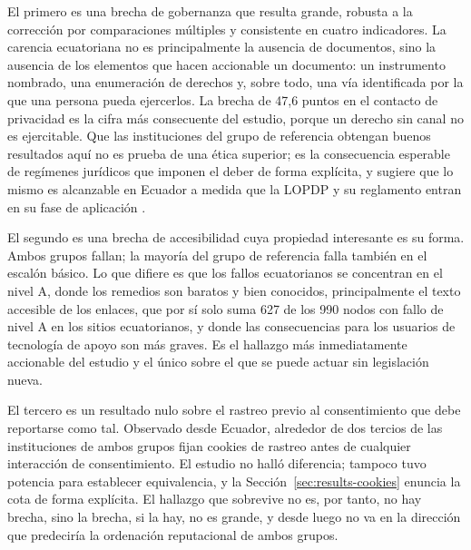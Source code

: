 \documentclass[pdflatex,sn-basic,Numbered,iicol]{sn-jnl}
\theoremstyle{thmstyleone}
\theoremstyle{thmstyletwo}
\theoremstyle{thmstylethree}
\begin{document}
El primero es una brecha de gobernanza que resulta grande, robusta a la correcci\'on por comparaciones m\'ultiples y consistente en cuatro indicadores. La carencia ecuatoriana no es principalmente la ausencia de documentos, sino la ausencia de los elementos que hacen accionable un documento: un instrumento nombrado, una enumeraci\'on de derechos y, sobre todo, una v\'ia identificada por la que una persona pueda ejercerlos. La brecha de 47,6 puntos en el contacto de privacidad es la cifra m\'as consecuente del estudio, porque un derecho sin canal no es ejercitable. Que las instituciones del grupo de referencia obtengan buenos resultados aqu\'i no es prueba de una \'etica superior; es la consecuencia esperable de reg\'imenes jur\'idicos que imponen el deber de forma expl\'icita, y sugiere que lo mismo es alcanzable en Ecuador a medida que la LOPDP y su reglamento entran en su fase de aplicaci\'on \citep{lopdp2021,reglamentolopdp2023}.

El segundo es una brecha de accesibilidad cuya propiedad interesante es su forma. Ambos grupos fallan; la mayor\'ia del grupo de referencia falla tambi\'en en el escal\'on b\'asico. Lo que difiere es que los fallos ecuatorianos se concentran en el nivel A, donde los remedios son baratos y bien conocidos, principalmente el texto accesible de los enlaces, que por s\'i solo suma 627 de los 990 nodos con fallo de nivel A en los sitios ecuatorianos, y donde las consecuencias para los usuarios de tecnolog\'ia de apoyo son m\'as graves. Es el hallazgo m\'as inmediatamente accionable del estudio y el \'unico sobre el que se puede actuar sin legislaci\'on nueva.

El tercero es un resultado nulo sobre el rastreo previo al consentimiento que debe reportarse como tal. Observado desde Ecuador, alrededor de dos tercios de las instituciones de ambos grupos fijan cookies de rastreo antes de cualquier interacci\'on de consentimiento. El estudio no hall\'o diferencia; tampoco tuvo potencia para establecer equivalencia, y la Secci\'on~\ref{sec:results-cookies} enuncia la cota de forma expl\'icita. El hallazgo que sobrevive no es, por tanto, \guillemotleft no hay brecha\guillemotright, sino \guillemotleft la brecha, si la hay, no es grande, y desde luego no va en la direcci\'on que predecir\'ia la ordenaci\'on reputacional de ambos grupos\guillemotright.
\end{document}
